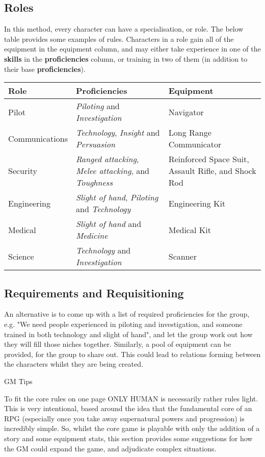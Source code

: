 \documentclass[11pt]{article}
\begin{document}
\begin{multicols}{3}
  \subsection*{Roles}

  In this method, every character can have a specialisation, or role. The below table provides some examples of rules. Characters in a role gain all of the equipment in the equipment column, and may either take experience in one of the \textbf{skills} in the \textbf{proficiencies} column, or training in two of them (in addition to their base \textbf{proficiencies}).

  \begin{tabularx}{\linewidth}{lXX}
    Role & Proficiencies & Equipment \\
    \hline
    Pilot & \textit{Piloting} and \textit{Investigation} & Navigator \\
    Communications & \textit{Technology}, \textit{Insight} and \textit{Persuasion} & Long Range Communicator \\
    Security & \textit{Ranged attacking}, \textit{Melee attacking}, and \textit{Toughness} & Reinforced Space Suit, Assault Rifle, and Shock Rod \\
    Engineering & \textit{Slight of hand}, \textit{Piloting} and \textit{Technology} & Engineering Kit \\
    Medical & \textit{Slight of hand} and \textit{Medicine} & Medical Kit \\
    Science & \textit{Technology} and \textit{Investigation} & Scanner
  \end{tabularx}

  \subsection*{Requirements and Requisitioning}

  An alternative is to come up with a list of required proficiencies for the group, e.g. "We need people experienced in piloting and investigation, and someone trained in both technology and slight of hand", and let the group work out how they will fill those niches together. Similarly, a pool of equipment can be provided, for the group to share out. This could lead to relations forming between the characters whilst they are being created.

  \begin{center}\LARGE GM Tips \end{center}

  To fit the core rules on one page ONLY HUMAN is necessarily rather rules light. This is very intentional, based around the idea that the fundamental core of an RPG (especially once you take away supernatural powers and progression) is incredibly simple. So, whilst the core game is playable with only the addition of a story and some equipment stats, this section provides some suggestions for how the GM could expand the game, and adjudicate complex situations.


\end{multicols}
\end{document}
